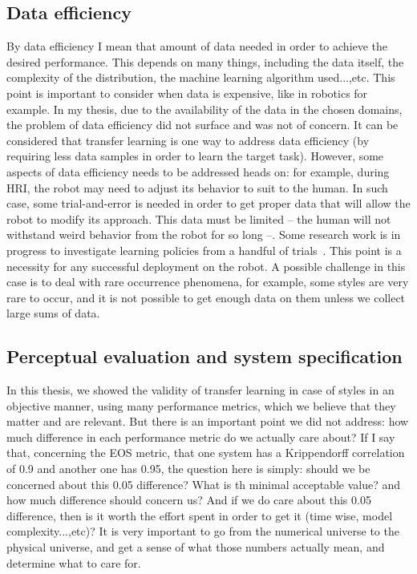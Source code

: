   \subsection{Data efficiency}
    \par By data efficiency I mean that amount of data needed in order to achieve the desired performance. This depends on many things, including the data itself, the complexity of the distribution, the machine learning algorithm used...,etc. This point is important to consider when data is expensive, like in robotics for example. In my thesis, due to the availability of the data in the chosen domains, the problem of data efficiency did not surface and was not of concern. It can be considered that transfer learning is one way to address data efficiency (by requiring less data samples in order to learn the target task). However, some aspects of data efficiency needs to be addressed heads on: for example, during HRI, the robot may need to adjust its behavior to suit to the human. In such case, some trial-and-error is needed in order to get proper data that will allow the robot to modify its approach. This data must be limited -- the human will not withstand weird behavior from the robot for so long --. Some research work is in progress to investigate learning policies from a handful of trials~\citep{cully2015robots,Chatzilygeroudis18}. This point is a necessity for any successful deployment on the robot. A possible challenge in this case is to deal with rare occurrence phenomena, for example, some styles are very rare to occur, and it is not possible to get enough data on them unless we collect large sums of data.

  \subsection{Perceptual evaluation and system specification}
    \par In this thesis, we showed the validity of transfer learning in case of styles in an objective manner, using many performance metrics, which we believe that they matter and are relevant. But there is an important point we did not address: how much difference in each performance metric do we actually care about? If I say that, concerning the EOS metric, that one system has a Krippendorff correlation of 0.9 and another one has 0.95, the question here is simply: should we be concerned about this 0.05 difference? What is th minimal acceptable value? and how much difference should concern us? And if we do care about this 0.05 difference, then is it worth the effort spent in order to get it (time wise, model complexity...,etc)? It is very important to go from the numerical universe to the physical universe, and get a sense of what those numbers actually mean, and determine what to care for.

